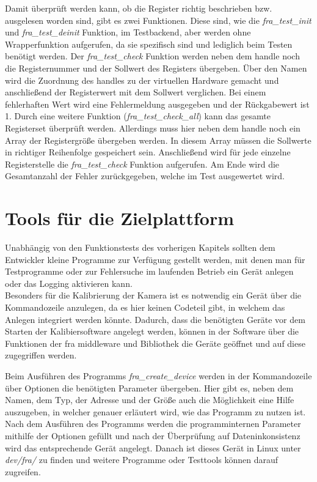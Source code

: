 Damit überprüft werden kann, ob die Register richtig beschrieben bzw. ausgelesen worden sind, gibt es zwei Funktionen. Diese sind, wie die \textit{fra\_test\_init} und \textit{fra\_test\_deinit} Funktion, im Testbackend, aber werden ohne Wrapperfunktion aufgerufen, da sie spezifisch sind und lediglich beim Testen benötigt werden.
Der \textit{fra\_test\_check} Funktion werden neben dem \gls{handle} noch die Registernummer und der Sollwert des Registers übergeben. Über den Namen wird die Zuordnung des \glspl{handle} zu der virtuellen Hardware gemacht und anschließend der Registerwert mit dem Sollwert verglichen. Bei einem fehlerhaften Wert wird eine Fehlermeldung ausgegeben und der Rückgabewert ist 1.
Durch eine weitere Funktion (\textit{fra\_test\_check\_all}) kann das gesamte Registerset überprüft werden. Allerdings muss hier neben dem \gls{handle} noch ein Array der Registergröße übergeben werden. In diesem Array müssen die Sollwerte in richtiger Reihenfolge gespeichert sein. Anschließend wird für jede einzelne Registerstelle die \textit{fra\_test\_check} Funktion aufgerufen. Am Ende wird die Gesamtanzahl der Fehler zurückgegeben, welche im Test ausgewertet wird.\\




\section{Tools für die Zielplattform}
Unabhängig von den Funktionstests des vorherigen Kapitels sollten dem Entwickler kleine Programme zur Verfügung gestellt werden, mit denen man für Testprogramme oder zur Fehlersuche im laufenden Betrieb ein Gerät anlegen oder das Logging aktivieren kann. \\


Besonders für die Kalibrierung der Kamera ist es notwendig ein Gerät über die Kommandozeile anzulegen, da es hier keinen Codeteil gibt, in welchem das Anlegen integriert werden könnte. Dadurch, dass die benötigten Geräte vor dem Starten der Kalibiersoftware angelegt werden, können in der Software über die Funktionen der \ac{fra} \gls{middleware} und Bibliothek die Geräte geöffnet und auf diese zugegriffen werden.


Beim Ausführen des Programms \textit{fra\_create\_device} werden in der Kommandozeile über Optionen die benötigten Parameter übergeben. Hier gibt es, neben dem Namen, dem Typ, der Adresse und der Größe auch die Möglichkeit eine Hilfe auszugeben, in welcher genauer erläutert wird, wie das Programm zu nutzen ist. 
Nach dem Ausführen des Programms werden die programminternen Parameter mithilfe der Optionen gefüllt und nach der Überprüfung auf Dateninkonsistenz wird das entsprechende Gerät angelegt. 
Danach ist dieses Gerät in Linux unter \textit{dev/fra/} zu finden und weitere Programme oder Testtools können darauf zugreifen.\\


